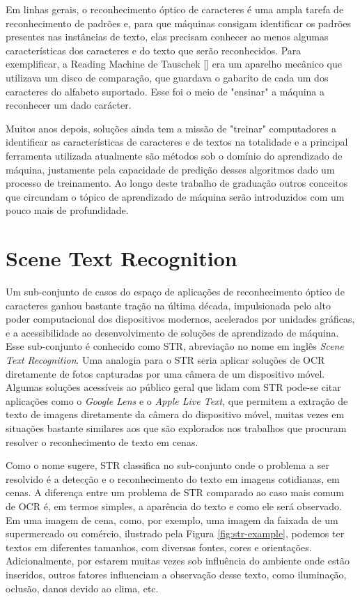 Em linhas gerais, o reconhecimento óptico de caracteres é uma ampla tarefa de reconhecimento de padrões e, para que máquinas consigam identificar 
os padrões presentes nas instâncias de texto, elas precisam conhecer ao menos algumas características dos caracteres e do texto que serão 
reconhecidos. Para exemplificar, a Reading Machine de Tauschek [] era um aparelho mecânico que utilizava um disco de 
comparação, que guardava o gabarito de cada um dos caracteres do alfabeto suportado. Esse foi o meio de "ensinar" a máquina a reconhecer um dado carácter.

Muitos anos depois, soluções ainda tem a missão de "treinar" computadores a identificar as características de caracteres e de textos na totalidade 
e a principal ferramenta utilizada atualmente são métodos sob o domínio do aprendizado de máquina, justamente pela capacidade de predição desses 
algoritmos dado um processo de treinamento. Ao longo deste trabalho de graduação outros conceitos que circundam o tópico de aprendizado de máquina 
serão introduzidos com um pouco mais de profundidade.

\section{Scene Text Recognition}

Um sub-conjunto de casos do espaço de aplicações de reconhecimento óptico de caracteres ganhou bastante tração na última década, impulsionada pelo 
alto poder computacional dos dispositivos modernos, acelerados por unidades gráficas, e a acessibilidade ao desenvolvimento de soluções de aprendizado 
de máquina. Esse sub-conjunto é conhecido como STR, abreviação no nome em inglês \textit{Scene Text Recognition}. Uma analogia para o STR seria 
aplicar soluções de OCR diretamente de fotos capturadas por uma câmera de um dispositivo móvel. Algumas soluções acessíveis ao público geral que lidam 
com STR  pode-se citar aplicações como o \textit{Google Lens} e o \textit{Apple Live Text}, que permitem a extração de texto de imagens diretamente 
da câmera do dispositivo móvel, muitas vezes em situações bastante similares aos que são explorados nos trabalhos que procuram resolver o reconhecimento 
de texto em cenas.

Como o nome sugere, STR classifica no sub-conjunto onde o problema a ser resolvido é a detecção e o reconhecimento do texto em imagens cotidianas, em cenas. 
A diferença entre um problema de STR comparado ao caso mais comum de OCR é, em termos simples, a aparência do texto e como ele será observado. 
Em uma imagem de cena, como, por exemplo, uma imagem da faixada de um supermercado ou comércio, ilustrado pela Figura \ref{fig:str-example}, podemos 
ter textos em diferentes tamanhos, com diversas fontes, cores e orientações. Adicionalmente, por estarem muitas vezes sob influência do ambiente onde 
estão inseridos, outros fatores influenciam a observação desse texto, como iluminação, oclusão, danos devido ao clima, etc.

